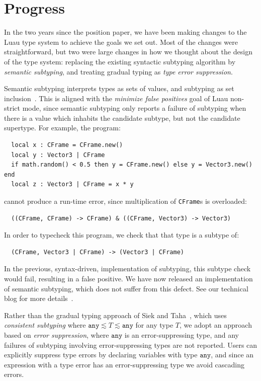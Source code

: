 \documentclass[acmsmall]{acmart}
\newcommand{\ANY}{\mathtt{any}}
\begin{document}
\section{Progress}

In the two years since the position paper, we have been making changes
to the Luau type system to achieve the goals we set out. Most of the
changes were straightforward, but two were large changes in how we
thought about the design of the type system: replacing the existing
syntactic subtyping algorithm by \emph{semantic subtyping}, and
treating gradual typing as \emph{type error suppression}.

Semantic subtyping
interprets types as sets of values, and subtyping as set
inclusion~\cite{GF05:GentleIntroduction}. This is aligned with the
\emph{minimize false positives} goal of Luau non-strict mode, since
semantic subtyping only reports a failure of subtyping when there is a
value which inhabits the candidate subtype, but not the candidate
supertype.
For example, the program:
\begin{verbatim}
  local x : CFrame = CFrame.new()
  local y : Vector3 | CFrame
  if math.random() < 0.5 then y = CFrame.new() else y = Vector3.new() end
  local z : Vector3 | CFrame = x * y
\end{verbatim}
cannot produce a run-time error, since multiplication of \verb|CFrame|s is overloaded:
\begin{verbatim}
  ((CFrame, CFrame) -> CFrame) & ((CFrame, Vector3) -> Vector3)
\end{verbatim}
In order to typecheck this program, we check that that type is a subtype of:
\begin{verbatim}
  (CFrame, Vector3 | CFrame) -> (Vector3 | CFrame)
\end{verbatim}
In the previous, syntax-driven, implementation of subtyping, this subtype check  would fail, resulting in a false positive.
We have now released an implementation of semantic subtyping, which does not suffer from this defect.
See our technical blog for more details~\cite{Jef22:SemanticSubtyping}.

Rather than the gradual typing approach
of Siek and Taha~\cite{ST07:GradualTyping}, which uses \emph{consistent
subtyping} where $\ANY \lesssim T \lesssim \ANY$ for any type $T$, we
adopt an approach based on \emph{error suppression}, where $\ANY$ is
an error-suppressing type, and any failures of subtyping involving
error-suppressing types are not reported. Users can explicitly
suppress type errors by declaring variables with type $\ANY$, and
since an expression with a type error has an error-suppressing type we
avoid cascading errors.
\end{document}
